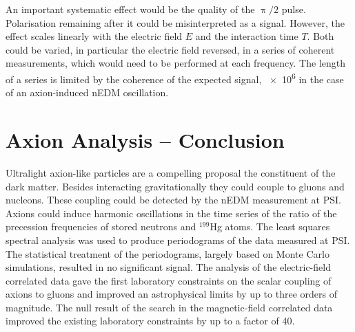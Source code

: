 An important systematic effect would be the quality of the $\uppi/2$ pulse. Polarisation remaining after it could be misinterpreted as a signal. However, the effect scales linearly with the electric field $E$ and the interaction time $T$. Both could be varied, in particular the electric field reversed, in a series of coherent measurements, which would need to be performed at each frequency. The length of a series is limited by the coherence of the expected signal, \num{e6} in the case of an axion-induced nEDM oscillation.




\section*{Axion Analysis -- Conclusion}
Ultralight axion-like particles are a compelling proposal the constituent of the dark matter. Besides interacting gravitationally they could couple to gluons and nucleons. These coupling could be detected by the nEDM measurement at PSI\@. Axions could induce harmonic oscillations in the time series of the ratio of the precession frequencies of stored neutrons and ${}^{199}$Hg atoms. The least squares spectral analysis was used to produce periodograms of the data measured at PSI\@. The statistical treatment of the periodograms, largely based on Monte Carlo simulations, resulted in no significant signal. The analysis of the electric-field correlated data gave the first laboratory constraints on the scalar coupling of axions to gluons and improved an astrophysical limits by up to three orders of magnitude. The null result of the search in the magnetic-field correlated data improved the existing laboratory constraints by up to a factor of 40.
